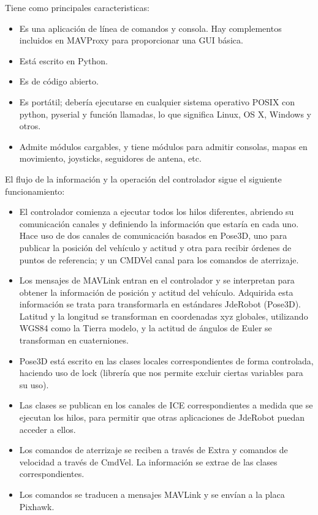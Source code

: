 Tiene como principales caracteristicas:

\begin{itemize}
\item Es una aplicación de línea de comandos y consola. Hay complementos incluidos en MAVProxy
para proporcionar una GUI básica.
\item Está escrito en Python.
\item Es de código abierto.
\item Es portátil; debería ejecutarse en cualquier sistema operativo POSIX con python, pyserial y función
llamadas, lo que significa Linux, OS X, Windows y otros.
\item Admite módulos cargables, y tiene módulos para admitir consolas, mapas en movimiento,
joysticks, seguidores de antena, etc.
\end{itemize}

El flujo de la información y la operación del controlador sigue el siguiente funcionamiento:

\begin{itemize}
\item El controlador comienza a ejecutar todos los hilos diferentes, abriendo su comunicación canales y definiendo la información que estaría en cada uno. Hace uso de dos canales de comunicación basados en Pose3D, uno para publicar la posición del vehículo y actitud y otra para recibir órdenes de puntos de referencia; y un CMDVel canal para los comandos de aterrizaje.
\item Los mensajes de MAVLink entran en el controlador y se interpretan para obtener la información de posición y actitud del vehículo. Adquirida esta  información se trata para transformarla en estándares JdeRobot (Pose3D). Latitud y la longitud se transforman en coordenadas xyz globales, utilizando WGS84 como la Tierra modelo, y la actitud de ángulos de Euler se transforman en cuaterniones.
\item Pose3D está escrito en las clases locales correspondientes de forma controlada, haciendo uso de lock (librería que nos permite excluir ciertas variables para su uso).
\item Las clases se publican en los canales de ICE correspondientes a medida que se ejecutan los hilos, para permitir que otras aplicaciones de JdeRobot puedan acceder a ellos.
\item Los comandos de aterrizaje se reciben a través de Extra y comandos de velocidad a través de CmdVel. La información se extrae de las clases correspondientes.
\item Los comandos se traducen a mensajes MAVLink y se envían a la placa Pixhawk.
\end{itemize}

